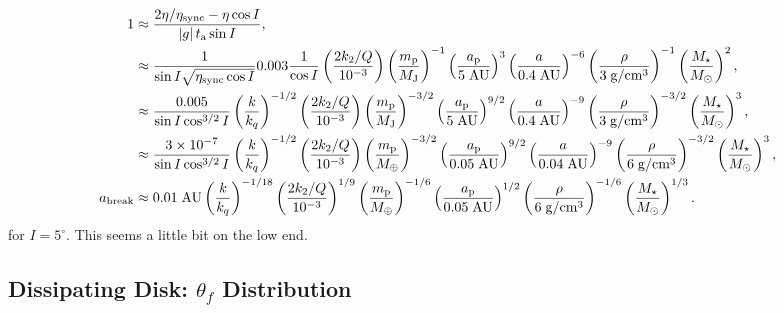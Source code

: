 \documentclass[11pt,
        usenames, %
        dvipsnames %
    ]{article}
\newcommand*{\abs}[1]{\left|#1\right|}
\newcommand*{\p}[1]{\left(#1\right)}
\begin{document}
\begin{align}
    1
        &\approx \frac{2\eta / \eta_{\rm sync} - \eta \cos I
            }{\abs{g}t_{\rm a}\sin I},\\
        &\approx \frac{1}{\sin I\sqrt{\eta_{\rm sync}\cos I}}
            0.003 \frac{1}{\cos I}\p{\frac{2 k_2 / Q}{10^{-3}}}
                \p{\frac{m_{\rm p}}{M_{\rm J}}}^{-1}
                \p{\frac{a_{\rm p}}{5\;\mathrm{AU}}}^{3}
                \p{\frac{a}{0.4\;\mathrm{AU}}}^{-6}
                \p{\frac{\rho}{3\;\mathrm{g/cm^3}}}^{-1}
                \p{\frac{M_{\star}}{M_{\odot}}}^2,\\
        &\approx \frac{0.005}{\sin I \cos^{3/2}I}
            \p{\frac{k}{k_q}}^{-1/2}
            \p{\frac{2 k_2 / Q}{10^{-3}}}
            \p{\frac{m_{\rm p}}{M_{\rm J}}}^{-3/2}
            \p{\frac{a_{\rm p}}{5\;\mathrm{AU}}}^{9/2}
            \p{\frac{a}{0.4\;\mathrm{AU}}}^{-9}
            \p{\frac{\rho}{3\;\mathrm{g/cm^3}}}^{-3/2}
            \p{\frac{M_{\star}}{M_{\odot}}}^3,\\
        &\approx \frac{3 \times 10^{-7}}{\sin I \cos^{3/2}I}
            \p{\frac{k}{k_q}}^{-1/2}
            \p{\frac{2 k_2 / Q}{10^{-3}}}
            \p{\frac{m_{\rm p}}{M_{\rm \oplus}}}^{-3/2}
            \p{\frac{a_{\rm p}}{0.05\;\mathrm{AU}}}^{9/2}
            \p{\frac{a}{0.04\;\mathrm{AU}}}^{-9}
            \p{\frac{\rho}{6\;\mathrm{g/cm^3}}}^{-3/2}
            \p{\frac{M_{\star}}{M_{\odot}}}^3,\\
    a_{\rm break}
        &\approx 0.01\;\mathrm{AU}
            \p{\frac{k}{k_q}}^{-1/18}
            \p{\frac{2 k_2 / Q}{10^{-3}}}^{1/9}
            \p{\frac{m_{\rm p}}{M_{\rm \oplus}}}^{-1/6}
            \p{\frac{a_{\rm p}}{0.05\;\mathrm{AU}}}^{1/2}
            \p{\frac{\rho}{6\;\mathrm{g/cm^3}}}^{-1/6}
            \p{\frac{M_{\star}}{M_{\odot}}}^{1/3}.
\end{align}
for $I = 5^\circ$. This seems a little bit on the low end.

\subsection{Dissipating Disk: $\theta_f$ Distribution}
\end{document}

